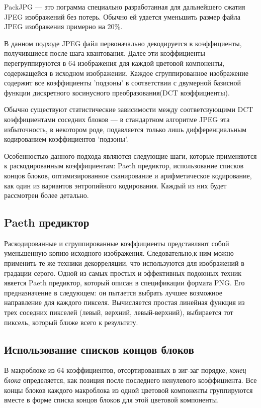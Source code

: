\documentclass{matmex-diploma-custom}
\begin{document}
PackJPG --- это пограмма специально разработанная для дальнейшего сжатия JPEG изображений без потерь. Обычно ей удается уменьшить размер файла JPEG изображения  примерно на 20\%.

В данном подходе JPEG файл первоначально декодируется в коэффициенты, получившиеся после шага квантования.
Далее эти коэффициенты перегруппируются в 64 изображения для каждой цветовой компоненты, содержащейся в исходном изображении. Каждое сгруппированное изображение содержит все коэффициенты 'подзоны' в соответствии с  двумерной  базисной функции дискретного косинусного преобразования(DCT коэффициенты).

Обычно существуют статистические зависимости между соответсвующими DCT коэффициентами соседних блоков --- в стандартном алгоритме JPEG эта избыточность, в некотором роде, подавляется только лишь дифференциальным кодированием коэффициентов 'подзоны'.

Особенностью данного подхода являются следующие шаги, которые применяются к раскодированным коэффициентам:
Paeth предиктор, использование списков концов блоков, оптимизированное сканирование и арифметическое кодирование, как один из вариантов энтропийного кодирования. Каждый из них будет рассмотрен более детально.

\subsection{Paeth предиктор}

Раскодированные и сгруппированные коэффициенты представляют собой уменьшенную копию исходного изображения. Следовательно,к ним  можно применить те же техники декорреляции, что используются для изображений в градации серого.
Одной из самых простых и эффективных подоюных техник явяется Paeth предиктор, который описан в спецификации формата PNG. Его предназначение в следующем: он пытается выбрать лучшее возможное направление для каждого пикселя. Вычисляется простая линейная функция из трех соседних пикселей (левый, верхний, левый-верхний), выбирается тот пиксель, который ближе всего к результату.

\subsection{Использование списков концов блоков}
В макроблоке из 64 коэффициентов, отсортированных в зиг-заг порядке, \emph{конец блока} определяется, как позиция после последнего ненулевого коэффициента. Все концы блоков каждого макроблока из одной цветовой компоненты группируются вместе в форме списка концов блоков для этой цветовой компоненты.
\end{document}
